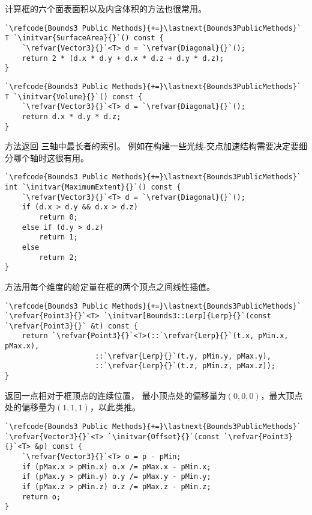 计算框的六个面表面积以及内含体积的方法也很常用。
\begin{lstlisting}
`\refcode{Bounds3 Public Methods}{+=}\lastnext{Bounds3PublicMethods}`
T `\initvar{SurfaceArea}{}`() const {
    `\refvar{Vector3}{}`<T> d = `\refvar{Diagonal}{}`();
    return 2 * (d.x * d.y + d.x * d.z + d.y * d.z);
}
\end{lstlisting}

\begin{lstlisting}
`\refcode{Bounds3 Public Methods}{+=}\lastnext{Bounds3PublicMethods}`
T `\initvar{Volume}{}`() const {
    `\refvar{Vector3}{}`<T> d = `\refvar{Diagonal}{}`();
    return d.x * d.y * d.z;
}
\end{lstlisting}

方法返回
三轴中最长者的索引。
例如在构建一些光线-交点加速结构需要决定要细分哪个轴时这很有用。
\begin{lstlisting}
`\refcode{Bounds3 Public Methods}{+=}\lastnext{Bounds3PublicMethods}`
int `\initvar{MaximumExtent}{}`() const {
    `\refvar{Vector3}{}`<T> d = `\refvar{Diagonal}{}`();
    if (d.x > d.y && d.x > d.z)
        return 0;
    else if (d.y > d.z)
        return 1;
    else
        return 2;
}
\end{lstlisting}

方法用每个维度的给定量在框的两个顶点之间线性插值。
\begin{lstlisting}
`\refcode{Bounds3 Public Methods}{+=}\lastnext{Bounds3PublicMethods}`
`\refvar{Point3}{}`<T> `\initvar[Bounds3::Lerp]{Lerp}{}`(const `\refvar{Point3}{}` &t) const {
    return `\refvar{Point3}{}`<T>(::`\refvar{Lerp}{}`(t.x, pMin.x, pMax.x),
                     ::`\refvar{Lerp}{}`(t.y, pMin.y, pMax.y),
                     ::`\refvar{Lerp}{}`(t.z, pMin.z, pMax.z));
}
\end{lstlisting}

返回一点相对于框顶点的连续位置，
最小顶点处的偏移量为$(0,0,0)$，最大顶点处的偏移量为$(1,1,1)$，以此类推。
\begin{lstlisting}
`\refcode{Bounds3 Public Methods}{+=}\lastnext{Bounds3PublicMethods}`
`\refvar{Vector3}{}`<T> `\initvar{Offset}{}`(const `\refvar{Point3}{}`<T> &p) const {
    `\refvar{Vector3}{}`<T> o = p - pMin;
    if (pMax.x > pMin.x) o.x /= pMax.x - pMin.x;
    if (pMax.y > pMin.y) o.y /= pMax.y - pMin.y;
    if (pMax.z > pMin.z) o.z /= pMax.z - pMin.z;
    return o;
}
\end{lstlisting}

